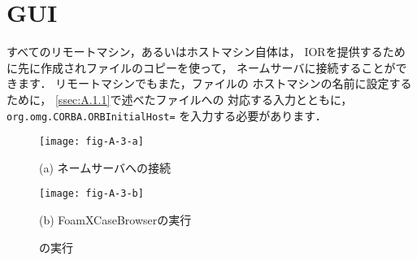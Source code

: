 \section{ GUI}
\label{sec:A.2}
%
すべてのリモートマシン，あるいはホストマシン自体は，
IORを提供するために先に作成されファイルのコピーを使って，
ネームサーバに接続することができます．
リモートマシンでもまた，ファイルの
ホストマシンの名前に設定するために，
\autoref{ssec:A.1.1}で述べたファイルへの
対応する入力とともに，
\verb|org.omg.CORBA.ORBInitialHost=| を入力する必要があります．


\begin{figure}[ht]
 \texttt{[image: fig-A-3-a]}\par
 (a) ネームサーバへの接続\par
 \medskip
 \texttt{[image: fig-A-3-b]}\par
 (b) FoamXCaseBrowserの実行
 \caption{の実行}
 \label{fig:A.3}
\end{figure}


